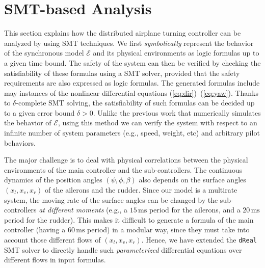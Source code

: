 \documentclass{sig-alternate}
\begin{document}
 


\section{SMT-based Analysis}

This section explains how the distributed airplane turning  
controller
can be analyzed by using SMT  techniques.
We first \emph{symbolically} represent 
the behavior  of the synchronous model $\mathcal{E}$
and  its physical environments as logic formulas up to a given time bound. 
The safety of the system can then be verified 
 by checking the satisfiability of these formulas using a SMT solver, 
 provided that the safety requirements are also expressed as logic formulas.
The generated formulas include 
may instances of the nonlinear differential equations (\ref{eq:dir})--(\ref{eq:yaw}).
Thanks to $\delta$-complete SMT solving, 
the satisfiability of such formulas can be decided 
up to a given error bound $\delta > 0$.
Unlike the previous work \cite{ftscs-journal}
that numerically simulates the behavior of $\mathcal{E}$, 
using this method we can verify the system 
with respect to 
an infinite number of  system parameters (e.g., speed, weight, etc)
and arbitrary pilot behaviors.


The major challenge is to deal with physical correlations
between the physical environments of the main controller and the sub-controllers.
The continuous dynamics of the position angles $(\psi, \phi, \beta)$
also depends on the surface angles $(x_l, x_v, x_r)$ of the ailerons and the rudder. 
Since our model is a multirate system,
the moving rate of the surface angles can be changed by the sub-controllers
\emph{at different moments}
(e.g., a $15\,\mathrm{ms}$ period for the ailerons, and a $20\,\mathrm{ms}$ period for the rudder).
This makes it difficult to generate a formula of the main controller (having a $60\,\mathrm{ms}$ period) in a modular way,
since they must take into account those different flows of $(x_l, x_v, x_r)$.
Hence, we have extended the \texttt{dReal} SMT solver
to directly handle such \emph{parameterized} differential equations over different flows
in input formulas.
\end{document}
